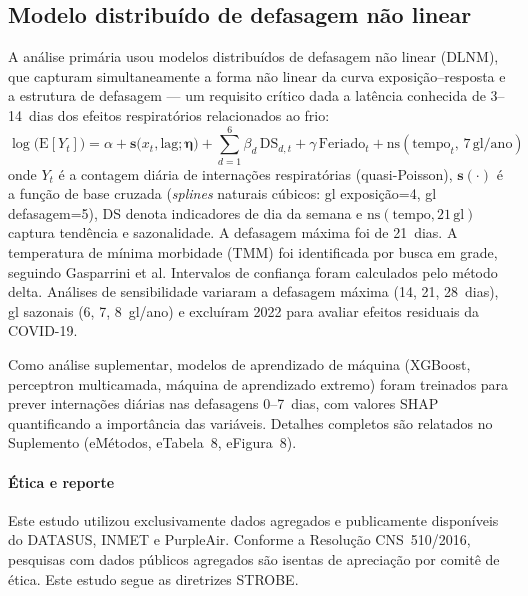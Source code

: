 \documentclass[12pt]{article}
\begin{document}
\subsection{Modelo distribuído de defasagem não linear}

A análise primária usou modelos distribuídos de defasagem não linear
(DLNM), que capturam simultaneamente a forma não linear da curva
exposição--resposta e a estrutura de defasagem --- um requisito
crítico dada a latência conhecida de 3--14~dias dos efeitos
respiratórios relacionados ao frio:
%
\begin{equation}
  \log\!\big(\mathrm{E}[Y_t]\big) = \alpha
    + \mathbf{s}\bigl(x_t, \mathrm{lag}; \boldsymbol{\eta}\bigr)
    + \sum_{d=1}^{6} \beta_d \,\mathrm{DS}_{d,t}
    + \gamma \,\mathrm{Feriado}_t
    + \mathrm{ns}(\mathrm{tempo}_t,\, 7\,\mathrm{gl/ano})
\end{equation}
%
onde $Y_t$ é a contagem diária de internações respiratórias
(quasi-Poisson), $\mathbf{s}(\cdot)$ é a função de base cruzada
(\textit{splines} naturais cúbicos: gl exposição=4, gl defasagem=5),
DS denota indicadores de dia da semana e
$\mathrm{ns}(\mathrm{tempo}, 21\,\mathrm{gl})$ captura tendência
e sazonalidade. A defasagem máxima foi de 21~dias. A temperatura de
mínima morbidade (TMM) foi identificada por busca em grade, seguindo
Gasparrini et al. Intervalos de confiança foram calculados pelo método
delta. Análises de sensibilidade variaram a defasagem máxima (14, 21,
28~dias), gl sazonais (6, 7, 8~gl/ano) e excluíram 2022 para avaliar
efeitos residuais da COVID-19.

Como análise suplementar, modelos de aprendizado de máquina
(XGBoost, perceptron multicamada, máquina de aprendizado extremo)
foram treinados para prever internações diárias nas defasagens
0--7~dias, com valores SHAP quantificando a importância das variáveis.
Detalhes completos são relatados no Suplemento (eMétodos, eTabela~8,
eFigura~8).

\paragraph{Ética e reporte}
Este estudo utilizou exclusivamente dados agregados e publicamente
disponíveis do DATASUS, INMET e PurpleAir. Conforme a Resolução
CNS~510/2016, pesquisas com dados públicos agregados são isentas de
apreciação por comitê de ética. Este estudo segue as diretrizes
STROBE.

\end{document}
